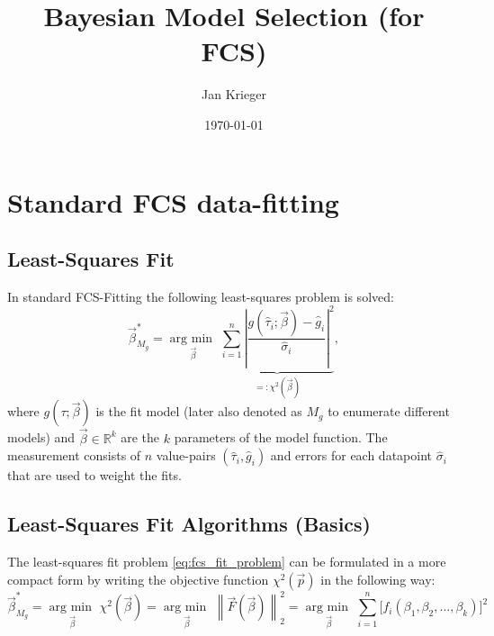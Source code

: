 \documentclass[a4paper,notitlepage]{article}
\DeclareMathOperator*{\argmin}{arg\:min\ }
\begin{document}
\title{Bayesian Model Selection (for FCS)}
\author{Jan Krieger}
\date{\today}
\maketitle
\tableofcontents

\section{Standard FCS data-fitting}
\subsection{Least-Squares Fit}
In standard FCS-Fitting the following least-squares problem is solved:
\begin{equation}\label{eq:fcs_fit_problem}
  \vec{\beta}_{M_g}^\ast=\argmin\limits_{\vec{\beta}}\underbrace{\sum\limits_{i=1}^n\left|\frac{g(\hat{\tau}_i;\vec{\beta})-\hat{g}_i}{\hat{\sigma}_i}\right|^2}_{=:\chi^2(\vec{\beta})},
\end{equation}
where $g(\tau;\vec{\beta})$ is the fit model (later also denoted as $M_g$ to enumerate different models) and $\vec{\beta}\in\mathbb{R}^k$ are the $k$ parameters of the model function. The measurement consists of $n$ value-pairs $(\hat{\tau}_i,\hat{g}_i)$ and errors for each datapoint $\hat{\sigma}_i$ that are used to weight the fits.

\subsection{Least-Squares Fit Algorithms (Basics)}
The least-squares fit problem \eqref{eq:fcs_fit_problem} can be formulated in a more compact form by writing the objective function $\chi^2(\vec{p})$ in the following way:
\begin{equation}\label{eq:fcs_fit_problem_forfit}
  \vec{\beta}_{M_g}^\ast=\argmin\limits_{\vec{\beta}}\chi^2(\vec{\beta})%
  =\argmin\limits_{\vec{\beta}}\left\|\vec{F}(\vec{\beta})\right\|_2^2=\argmin\limits_{\vec{\beta}}\sum\limits_{i=1}^n\bigl[f_i(\beta_1,\beta_2,...,\beta_k)\bigr]^2
\end{equation}
\end{document}
